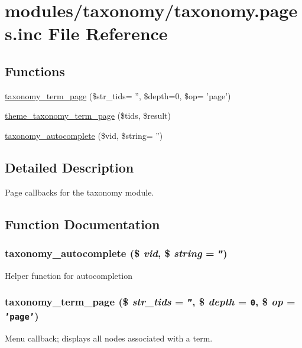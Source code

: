 \hypertarget{taxonomy_8pages_8inc}{
\section{modules/taxonomy/taxonomy.pages.inc File Reference}
\label{taxonomy_8pages_8inc}
}
\subsection*{Functions}
\begin{CompactItemize}
\item 
\hyperlink{taxonomy_8pages_8inc_3d5195dd588f6570fa85a8518fbb3c48}{taxonomy\_\-term\_\-page} (\$str\_\-tids= '', \$depth=0, \$op= 'page')
\item 
\hyperlink{group__themeable_g75a8915bc5bf8c1f69d1b5956761608e}{theme\_\-taxonomy\_\-term\_\-page} (\$tids, \$result)
\item 
\hyperlink{taxonomy_8pages_8inc_7f28262225ac3963a37373afa1dc4a53}{taxonomy\_\-autocomplete} (\$vid, \$string= '')
\end{CompactItemize}


\subsection{Detailed Description}
Page callbacks for the taxonomy module. 

\subsection{Function Documentation}
\hypertarget{taxonomy_8pages_8inc_7f28262225ac3963a37373afa1dc4a53}{
\subsubsection[{taxonomy\_\-autocomplete}]{\setlength{\rightskip}{0pt plus 5cm}taxonomy\_\-autocomplete (\$ {\em vid}, \/  \$ {\em string} = {\tt ''})}}
\label{taxonomy_8pages_8inc_7f28262225ac3963a37373afa1dc4a53}


Helper function for autocompletion \hypertarget{taxonomy_8pages_8inc_3d5195dd588f6570fa85a8518fbb3c48}{
\subsubsection[{taxonomy\_\-term\_\-page}]{\setlength{\rightskip}{0pt plus 5cm}taxonomy\_\-term\_\-page (\$ {\em str\_\-tids} = {\tt ''}, \/  \$ {\em depth} = {\tt 0}, \/  \$ {\em op} = {\tt 'page'})}}
\label{taxonomy_8pages_8inc_3d5195dd588f6570fa85a8518fbb3c48}


Menu callback; displays all nodes associated with a term. 